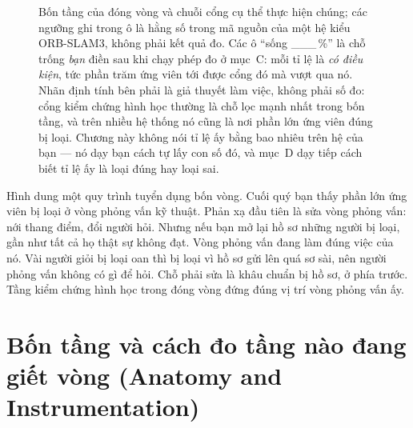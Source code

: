 \documentclass[../../deep_learning.tex]{subfiles}
\begin{document}
\begin{figure}[H]
{}
\caption{Bốn tầng của đóng vòng và chuỗi cổng cụ thể thực hiện chúng; các ngưỡng ghi trong ô là hằng số trong mã nguồn của một hệ kiểu ORB-SLAM3, không phải kết quả đo. Các ô ``sống \_\_\_\,\%'' là chỗ trống \emph{bạn} điền sau khi chạy phép đo ở mục~C: mỗi tỉ lệ là \emph{có điều kiện}, tức phần trăm ứng viên tới được cổng đó mà vượt qua nó. Nhãn định tính bên phải là giả thuyết làm việc, không phải số đo: cổng kiểm chứng hình học thường là chỗ lọc mạnh nhất trong bốn tầng, và trên nhiều hệ thống nó cũng là nơi phần lớn ứng viên đúng bị loại. Chương này không nói tỉ lệ ấy bằng bao nhiêu trên hệ của bạn --- nó dạy bạn cách tự lấy con số đó, và mục~D dạy tiếp cách biết tỉ lệ ấy là loại đúng hay loại sai.}
\label{fig:f29-phieu}
\end{figure}

\begin{trucgiac}
Hình dung một quy trình tuyển dụng bốn vòng. Cuối quý bạn thấy phần lớn ứng viên bị loại ở vòng phỏng vấn kỹ thuật. Phản xạ đầu tiên là sửa vòng phỏng vấn: nới thang điểm, đổi người hỏi. Nhưng nếu bạn mở lại hồ sơ những người bị loại, gần như tất cả họ thật sự không đạt. Vòng phỏng vấn đang làm đúng việc của nó. Vài người giỏi bị loại oan thì bị loại vì hồ sơ gửi lên quá sơ sài, nên người phỏng vấn không có gì để hỏi. Chỗ phải sửa là khâu chuẩn bị hồ sơ, ở phía trước. Tầng kiểm chứng hình học trong đóng vòng đứng đúng vị trí vòng phỏng vấn ấy.
\end{trucgiac}

\section{Bốn tầng và cách đo tầng nào đang giết vòng (Anatomy and Instrumentation)}
\end{document}
